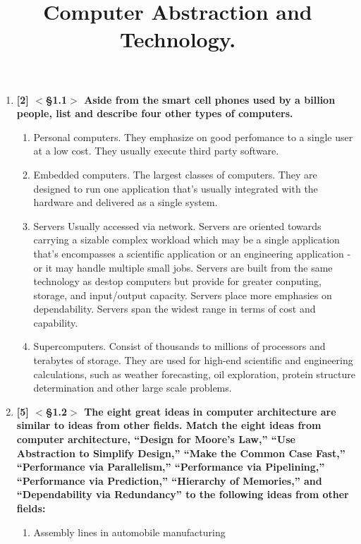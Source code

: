 \documentclass[11pt]{article}
\title{Computer Abstraction and Technology.}
\begin{document}
\maketitle
\begin{enumerate}
    \item [1.1]\textbf{[2] $<$§1.1$>$ Aside from the smart cell phones used by a billion people, list and describe four other types of computers.}
    \begin{enumerate}
        \item Personal computers.
        {\selectfont They emphasize on good perfomance to a single user at a low cost. They usually execute third party software.}
        \item Embedded computers.
        {\selectfont The largest classes of computers. They are designed to run one application that's usually integrated with the hardware
        and delivered as a single system.}
        \item Servers 
        {\selectfont Usually accessed via network. Servers are oriented towards carrying a sizable complex workload which may be a single application that's 
        encompasses a scientific application or an engineering application - or it may handle multiple small jobs. Servers are built from the same technology as destop computers
        but provide for greater conputing, storage, and input/output capacity. Servers place more emphasies on dependability. Servers span the widest range in terms of cost and capability.}
        \item Supercomputers.
        {\selectfont Consist of thousands to millions of processors and terabytes of storage. They are used for high-end scientific and engineering calculations,
        such as weather forecasting, oil exploration, protein structure determination and other large scale problems.}
    \end{enumerate}
    \item [1.2]\textbf{[5] $<$§1.2$>$ The eight great ideas in computer architecture are similar to ideas from other fields. Match the eight ideas from computer architecture, “Design for 
    Moore's Law,” “Use Abstraction to Simplify Design,” “Make the Common Case Fast,” “Performance via Parallelism,” “Performance via Pipelining,” “Performance 
    via Prediction,” “Hierarchy of Memories,” and “Dependability via Redundancy” to the following ideas from other fields:}
    \begin{enumerate}
        \item Assembly lines in automobile manufacturing\\

\end{enumerate}
\end{enumerate}
\end{document}
